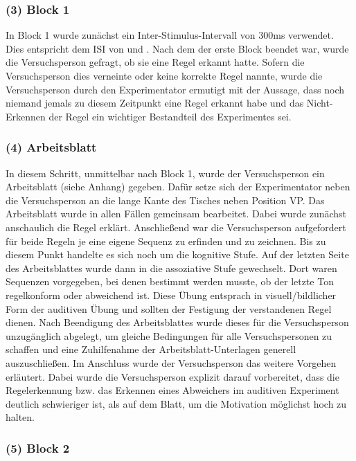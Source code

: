 \documentclass[doc,a4paper,12pt]{apa6}
\begin{document}
\subsubsection{(3) Block 1}

In Block 1 wurde zunächst ein Inter-Stimulus-Intervall von 300ms verwendet. Dies entspricht dem ISI von \textcite{paavilainen2007preattentive} und \textcite{bendixen2008rapid}. Nach dem der erste Block beendet war, wurde die Versuchsperson gefragt, ob sie eine Regel erkannt hatte. Sofern die Versuchsperson dies verneinte oder keine korrekte Regel nannte, wurde die Versuchsperson durch den Experimentator ermutigt mit der Aussage, dass noch niemand jemals zu diesem Zeitpunkt eine Regel erkannt habe und das Nicht-Erkennen der Regel ein wichtiger Bestandteil des Experimentes sei.

\subsubsection{(4) Arbeitsblatt}

In diesem Schritt, unmittelbar nach Block 1, wurde der Versuchsperson ein Arbeitsblatt (siehe Anhang) gegeben. Dafür setze sich der Experimentator neben die Versuchsperson an die lange Kante des Tisches neben Position VP. Das Arbeitsblatt wurde in allen Fällen gemeinsam bearbeitet. Dabei wurde zunächst anschaulich die Regel erklärt. Anschließend war die Versuchsperson aufgefordert für beide Regeln je eine eigene Sequenz zu erfinden und zu zeichnen. Bis zu diesem Punkt handelte es sich noch um die kognitive Stufe. Auf der letzten Seite des Arbeitsblattes wurde dann in die assoziative Stufe gewechselt. Dort waren Sequenzen vorgegeben, bei denen bestimmt werden musste, ob der letzte Ton regelkonform oder abweichend ist. Diese Übung entsprach in visuell/bildlicher Form der auditiven Übung und sollten der Festigung der verstandenen Regel dienen. Nach Beendigung des Arbeitsblattes wurde dieses für die Versuchsperson unzugänglich abgelegt, um gleiche Bedingungen für alle Versuchspersonen zu schaffen und eine Zuhilfenahme der Arbeitsblatt-Unterlagen generell auszuschließen. Im Anschluss wurde der Versuchsperson das weitere Vorgehen erläutert. Dabei wurde die Versuchsperson explizit darauf vorbereitet, dass die Regelerkennung bzw. das Erkennen eines Abweichers im auditiven Experiment deutlich schwieriger ist, als auf dem Blatt, um die Motivation möglichst hoch zu halten.

\subsubsection{(5) Block 2}
\end{document}
